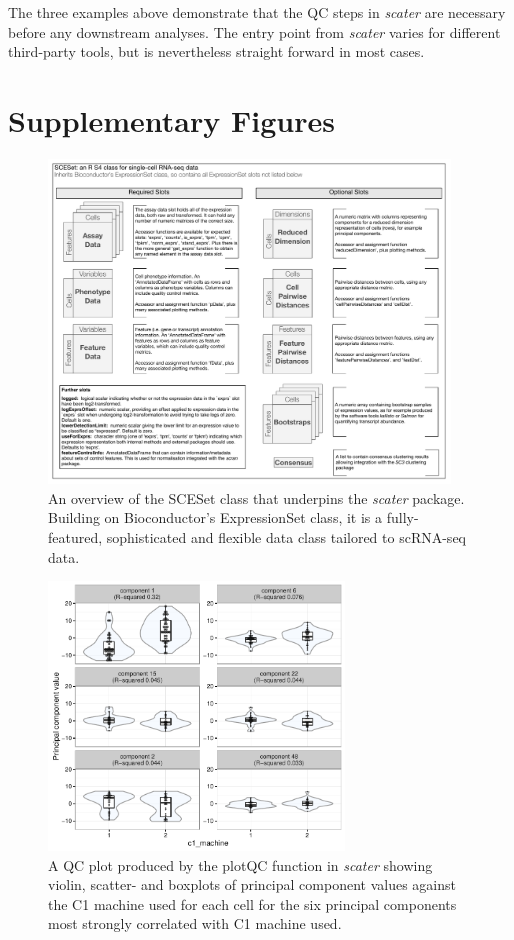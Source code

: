 \documentclass{revtex4}
\begin{document}
The three examples above demonstrate that the QC steps in \emph{scater} are necessary before any downstream analyses. The entry point from \emph{scater} varies for different third-party tools, but is nevertheless straight forward in most cases.


\section*{Supplementary Figures}


\begin{figure}[!tpb]%
\centerline{\includegraphics[width=0.95\textwidth]{figures/sceset_outline.pdf}}
\caption{An overview of the SCESet class that underpins the \emph{scater} package. Building on Bioconductor's ExpressionSet class, it is a fully-featured, sophisticated and flexible data class tailored to scRNA-seq data.}\label{fig:02}
\end{figure}


\begin{figure}[!tpb]
\centerline{\includegraphics[width=0.7\textwidth]{figures/find-pcs_c1_machine.pdf}}
\caption{A QC plot produced by the plotQC function in \emph{scater} showing violin, scatter- and boxplots of principal component values against the C1 machine used for each cell for the six principal components most strongly correlated with C1 machine used.}\label{fig:plotqc-c1-machine}
\end{figure}
\end{document}
